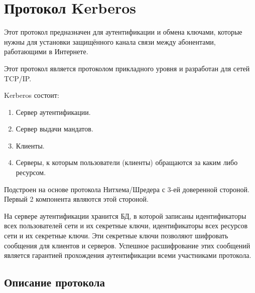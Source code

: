 \documentclass[12pt, russian, oneside, article]{ncc}
\begin{document}
\section{Протокол Kerberos}
\label{sec-8}


Этот протокол предназначен для аутентификации и обмена ключами, которые нужны для установки защищённого канала связи между абонентами, работающими в Интернете.

Этот протокол является протоколом прикладного уровня и разработан для сетей TCP/IP.

Kerberos состоит:
\begin{enumerate}
\item Сервер аутентификации.
\item Сервер выдачи мандатов.
\item Клиенты.
\item Серверы, к которым пользователи (клиенты) обращаются за каким либо ресурсом.
\end{enumerate}

Подстроен на основе протокола Нитхема/Шредера с 3-ей доверенной стороной. Первый 2 компонента являются этой стороной. 

На сервере аутентификации хранится БД, в которой записаны идентификаторы всех пользователей сети и их секретные ключи, идентификаторы всех ресурсов сети и их секретные ключи. Эти секретные ключи позволяют шифровать сообщения для клиентов и серверов. Успешное расшифрование этих сообщений является гарантией прохождения аутентификации всеми участниками протокола. 
\subsection{Описание протокола}
\label{sec-8_1}
\end{document}
